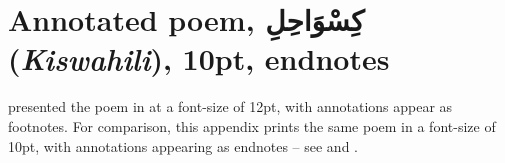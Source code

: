 \chapter{Annotated poem, \textarabic{كِسْوَاحِلِ} (\textit{Kiswahili}), 10pt, endnotes}
\renewcommand{\thesection}{D/\arabic{section}}  %
\setcounter{section}{0}  %
\label{appF}

 presented the poem in \citet{Abdulkadir2013} at a font-size of 12pt, with annotations appear as footnotes.  For comparison, this appendix prints the  same poem in a font-size of 10pt, with annotations appearing as endnotes -- see  and .


